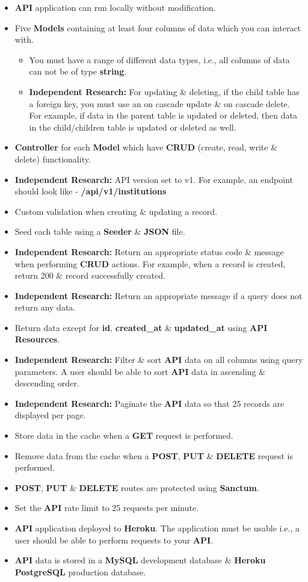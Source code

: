 \documentclass{article}
\begin{document}
\begin{itemize}
	\item \textbf{API} application can run locally without modification.
	\item Five \textbf{Models} containing at least four columns of data which you can interact with. 
	\begin{itemize}
    \item You must have a range of different data types, i.e., all columns of data can not be of type \textbf{string}.
    \item \textbf{Independent Research:} For updating \& deleting, if the child table has a foreign key, you must use an on cascade update \& on cascade delete. For example, if data in the parent table is updated or deleted, then data in the child/children table is updated or deleted as well.
  \end{itemize}
	\item \textbf{Controller} for each \textbf{Model} which have \textbf{CRUD} (create, read, write \& delete) functionality. 
	\item \textbf{Independent Research:} API version set to v1. For example, an endpoint should look like - \textbf{/api/v1/institutions}
	\item Custom validation when creating \& updating a record. 
	\item Seed each table using a \textbf{Seeder} \& \textbf{JSON} file.
	\item \textbf{Independent Research:} Return an appropriate status code \& message when performing \textbf{CRUD} actions. For example, when a record is created, return 200 \& record successfully created. 
  \item \textbf{Independent Research:} Return an appropriate message if a query does not return any data.
	\item Return data except for \textbf{id}, \textbf{created\_at} \& \textbf{updated\_at} using \textbf{API Resources}.
	\item \textbf{Independent Research:} Filter \& sort \textbf{API} data on all columns using query parameters. A user should be able to sort \textbf{API} data in ascending \& descending order.
	\item \textbf{Independent Research:} Paginate the \textbf{API} data so that 25 records are displayed per page.
	\item Store data in the cache when a \textbf{GET} request is performed. 
	\item Remove data from the cache when a \textbf{POST}, \textbf{PUT} \& \textbf{DELETE} request is performed.  
	\item \textbf{POST}, \textbf{PUT} \& \textbf{DELETE} routes are protected using \textbf{Sanctum}.
	\item Set the \textbf{API} rate limit to 25 requests per minute.
	\item \textbf{API} application deployed to \textbf{Heroku}. The application must be usable i.e., a user should be able to perform requests to your \textbf{API}.
	\item \textbf{API} data is stored in a \textbf{MySQL} development database \& \textbf{Heroku PostgreSQL} production database.	
\end{itemize}
\end{document}

